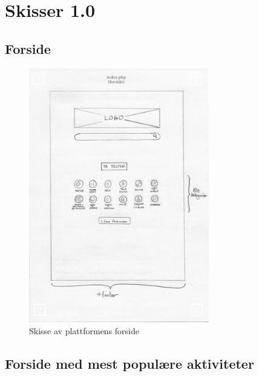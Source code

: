\chapter{Skisser 1.0}
\label{vedlegg:skisser1}

\section{Forside}

\begin{figure}[H]
\centering
\includegraphics[width=0.7\textwidth]{Illustrasjoner/Skisser-pdf/1.0/1-1-forside.pdf}
\caption{Skisse av plattformens forside}
\label{vedlegg:1-1-forside}
\end{figure}

\section{Forside med mest populære aktiviteter}

